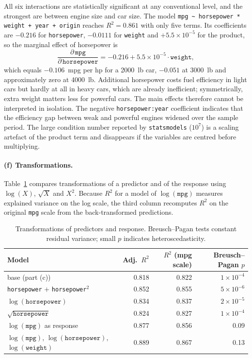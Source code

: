 \documentclass[11pt]{article}
\begin{document}
All six interactions are statistically significant at any conventional level, and the strongest are between engine size and car size. The model \texttt{mpg \textasciitilde{} horsepower * weight + year + origin} reaches $R^2 = 0.861$ with only five terms. Its coefficients are $-0.216$ for \texttt{horsepower}, $-0.0111$ for \texttt{weight} and $+5.5\times10^{-5}$ for the product, so the marginal effect of horsepower is
\begin{equation*}
  \frac{\partial\,\texttt{mpg}}{\partial\,\texttt{horsepower}} = -0.216 + 5.5\times10^{-5}\cdot\texttt{weight},
\end{equation*}
which equals $-0.106$~mpg per hp for a 2000~lb car, $-0.051$ at 3000~lb and approximately zero at 4000~lb. Additional horsepower costs fuel efficiency in light cars but hardly at all in heavy cars, which are already inefficient; symmetrically, extra weight matters less for powerful cars. The main effects therefore cannot be interpreted in isolation. The negative \texttt{horsepower:year} coefficient indicates that the efficiency gap between weak and powerful engines widened over the sample period. The large condition number reported by \texttt{statsmodels} ($10^7$) is a scaling artefact of the product term and disappears if the variables are centred before multiplying.

\paragraph{(f) Transformations.}
Table~\ref{tab:transforms} compares transformations of a predictor and of the response using $\log(X)$, $\sqrt{X}$ and $X^2$. Because $R^2$ for a model of $\log(\texttt{mpg})$ measures explained variance on the log scale, the third column recomputes $R^2$ on the original \texttt{mpg} scale from the back-transformed predictions.

\begin{table}[H]
  \centering
  \begin{tabular}{lrrr}
    \toprule
    Model & Adj.\ $R^2$ & $R^2$ (mpg scale) & Breusch--Pagan $p$ \\
    \midrule
    base (part (c))                                   & 0.818 & 0.822 & $1\times10^{-4}$ \\
    \texttt{horsepower} $+$ \texttt{horsepower}$^2$   & 0.852 & 0.855 & $5\times10^{-6}$ \\
    $\log(\texttt{horsepower})$                       & 0.834 & 0.837 & $2\times10^{-5}$ \\
    $\sqrt{\texttt{horsepower}}$                      & 0.824 & 0.827 & $1\times10^{-4}$ \\
    $\log(\texttt{mpg})$ as response                  & 0.877 & 0.856 & 0.09 \\
    $\log(\texttt{mpg})$, $\log(\texttt{horsepower})$, $\log(\texttt{weight})$ & 0.889 & 0.867 & 0.13 \\
    \bottomrule
  \end{tabular}
  \caption{Transformations of predictors and response. Breusch--Pagan tests constant residual variance; small $p$ indicates heteroscedasticity.}
  \label{tab:transforms}
\end{table}
\end{document}
